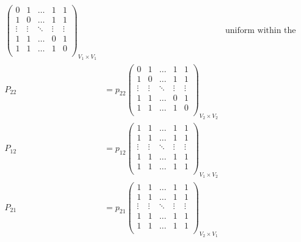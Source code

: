 \begin{itemize}
\[\begin{alignedat}{3}
\begin{pmatrix}
				      0      & 1      & \ldots & 1      & 1      \\
				      1      & 0      & \ldots & 1      & 1      \\
				      \vdots & \vdots & \ddots & \vdots & \vdots \\
				      1      & 1      & \ldots & 0      & 1      \\
				      1      & 1      & \ldots & 1      & 0      \\
			      \end{pmatrix}_{V_1 \times V_1}&& \text{uniform within the block}\\
			      P_{22} &= p_{22}\begin{pmatrix}
				      0      & 1      & \ldots & 1      & 1      \\
				      1      & 0      & \ldots & 1      & 1      \\
				      \vdots & \vdots & \ddots & \vdots & \vdots \\
				      1      & 1      & \ldots & 0      & 1      \\
				      1      & 1      & \ldots & 1      & 0      \\
			      \end{pmatrix}_{V_2 \times V_2}\\
			      P_{12} &= p_{12}\begin{pmatrix}
				      1      & 1      & \ldots & 1      & 1      \\
				      1      & 1      & \ldots & 1      & 1      \\
				      \vdots & \vdots & \ddots & \vdots & \vdots \\
				      1      & 1      & \ldots & 1      & 1      \\
				      1      & 1      & \ldots & 1      & 1      \\
			      \end{pmatrix}_{V_1 \times V_2}\\
			      P_{21} &= p_{21}\begin{pmatrix}
				      1      & 1      & \ldots & 1      & 1      \\
				      1      & 1      & \ldots & 1      & 1      \\
				      \vdots & \vdots & \ddots & \vdots & \vdots \\
				      1      & 1      & \ldots & 1      & 1      \\
				      1      & 1      & \ldots & 1      & 1      \\
			      \end{pmatrix}_{V_2 \times V_1}\\

\end{alignedat}\]
\end{itemize}
